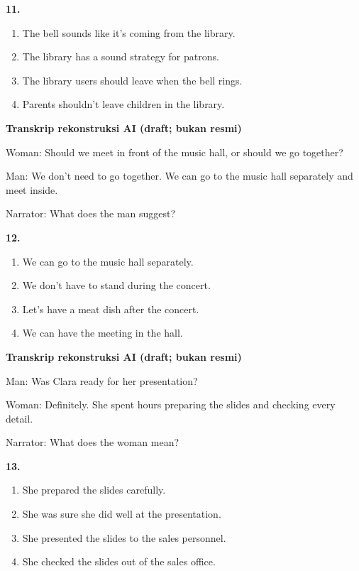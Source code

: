 \documentclass[12pt]{article}
\begin{document}
\noindent\textbf{11.}
\begin{enumerate}[label=(\Alph*),leftmargin=*,itemsep=0.2em]
\item The bell sounds like it's coming from the library.
\item The library has a sound strategy for patrons.
\item The library users should leave when the bell rings.
\item Parents shouldn't leave children in the library.
\end{enumerate}
\par
\vspace{0.25\baselineskip}
\begin{exampleblock}
\textbf{Transkrip rekonstruksi AI (draft; bukan resmi)}\par
Woman: Should we meet in front of the music hall, or should we go together?\par
Man: We don't need to go together. We can go to the music hall separately and meet inside.\par
Narrator: What does the man suggest?\par
\end{exampleblock}
\noindent\textbf{12.}
\begin{enumerate}[label=(\Alph*),leftmargin=*,itemsep=0.2em]
\item We can go to the music hall separately.
\item We don't have to stand during the concert.
\item Let's have a meat dish after the concert.
\item We can have the meeting in the hall.
\end{enumerate}
\par
\vspace{0.25\baselineskip}
\begin{exampleblock}
\textbf{Transkrip rekonstruksi AI (draft; bukan resmi)}\par
Man: Was Clara ready for her presentation?\par
Woman: Definitely. She spent hours preparing the slides and checking every detail.\par
Narrator: What does the woman mean?\par
\end{exampleblock}
\noindent\textbf{13.}
\begin{enumerate}[label=(\Alph*),leftmargin=*,itemsep=0.2em]
\item She prepared the slides carefully.
\item She was sure she did well at the presentation.
\item She presented the slides to the sales personnel.
\item She checked the slides out of the sales office.
\end{enumerate}
\end{document}
